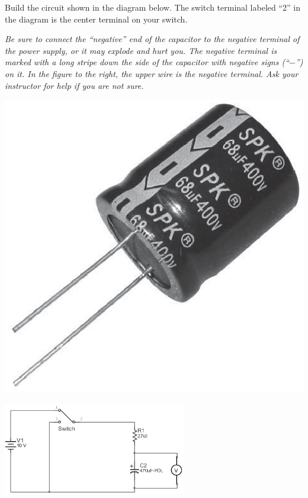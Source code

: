 Build the circuit shown in the diagram below.  The switch terminal labeled ``2'' in the diagram is the center terminal on your switch.

\begin{minipage}{0.82\textwidth}
\begin{newboxed}
\vspace{-0.2 in}
\textit{Be sure to connect the “negative” end of the capacitor to the negative terminal of the power supply, or it may explode and hurt you.  The negative terminal is marked with a long stripe down the side of the capacitor with negative signs (``$-$'') on it.  In the figure to the right, the upper wire is the negative terminal. Ask your instructor for help if you are not sure.}
\vspace{-0.1 in}
\end{newboxed}
\end{minipage}
\begin{minipage}{0.17\textwidth}
\includegraphics[width=1.0\textwidth]{rc_circuits/capacitor_bw.eps}
\end{minipage}

\begin{center}
\vspace{-0.3 in}
\includegraphics[width=0.6\textwidth]{rc_circuits/circuit_diagram_bw.eps}
\vspace{-0.2 in}
\end{center}


